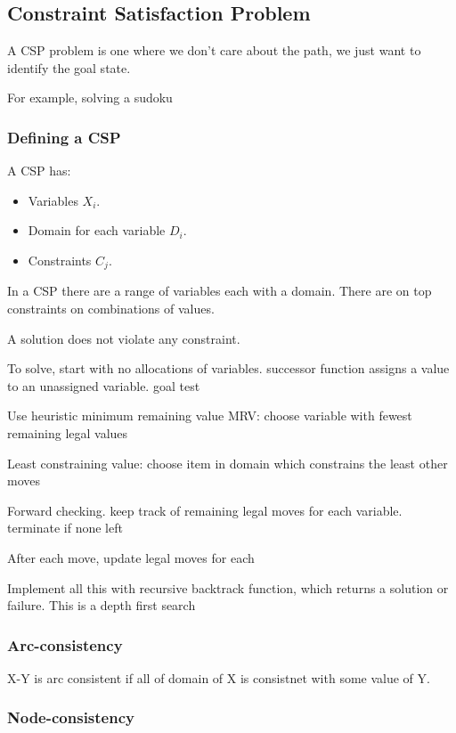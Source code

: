 
\subsection{Constraint Satisfaction Problem}

A CSP problem is one where we don't care about the path, we just want to identify the goal state.

For example, solving a sudoku

\subsubsection{Defining a CSP}

A CSP has:

\begin{itemize}
\item Variables \(X_i\).
\item Domain for each variable \(D_i\).
\item Constraints \(C_j\).
\end{itemize}

In a CSP there are a range of variables each with a domain. There are on top constraints on combinations of values.

A solution does not violate any constraint.

To solve, start with no allocations of variables. successor function assigns a value to an unassigned variable. goal test

Use heuristic minimum remaining value MRV: choose variable with fewest remaining legal values

Least constraining value: choose item in domain which constrains the least other moves

Forward checking. keep track of remaining legal moves for each variable. terminate if none left

After each move, update legal moves for each

Implement all this with recursive backtrack function, which returns a solution or failure. This is a depth first search

\subsubsection{Arc-consistency}

X-Y is arc consistent if all of domain of X is consistnet with some value of Y.

\subsubsection{Node-consistency}

